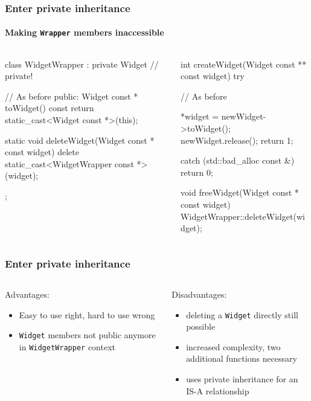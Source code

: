 \documentclass{beamer}
\def\code#1{\texttt{#1}}
\def\titleinframe#1{{\usebeamercolor[fg]{structure} #1}}
\begin{document}
\begin{frame}[fragile]
\frametitle{Enter private inheritance}
\framesubtitle{Making \code{Wrapper} members inaccessible}
\begin{columns}
\begin{column}{0.45\textwidth}
\begin{TinyC++}
class WidgetWrapper : private Widget // private!
{
	// As before
public:	
	Widget const * toWidget() const
	{
		return static_cast<Widget const *>(this);
	}
	
	static void deleteWidget(Widget const * const widget)
	{
		delete static_cast<WidgetWrapper const *>(widget);
	}
};
\end{TinyC++}
\end{column}
\begin{column}{0.45\textwidth}
\begin{TinyC++}
int createWidget(Widget const ** const widget)
try
{
	// As before
    
	*widget = newWidget->toWidget();
	newWidget.release();
	return 1;
}
catch (std::bad_alloc const &)
{
	return 0;
}

void freeWidget(Widget const * const widget)
{
	WidgetWrapper::deleteWidget(widget);
}
\end{TinyC++}
\end{column}
\end{columns}
\end{frame}


\begin{frame}[fragile]
\frametitle{Enter private inheritance}
\begin{columns}[T]
\begin{column}{0.45\textwidth}
	\titleinframe{Advantages:}
	
	\medskip
	\begin{itemize}
	\item Easy to use right, hard to use wrong
	\item \code{Widget} members not public anymore in \code{WidgetWrapper} context
	\end{itemize}
\end{column}
\begin{column}{0.45\textwidth}
	\titleinframe{Disadvantages:}
	
	\medskip
	\begin{itemize}
	\item deleting a \code{Widget} directly still possible
	\item increased complexity, two additional functions necessary
	\item uses private inheritance for an IS-A relationship
	\end{itemize}
\end{column}
\end{columns}
\end{frame}
\end{document}
